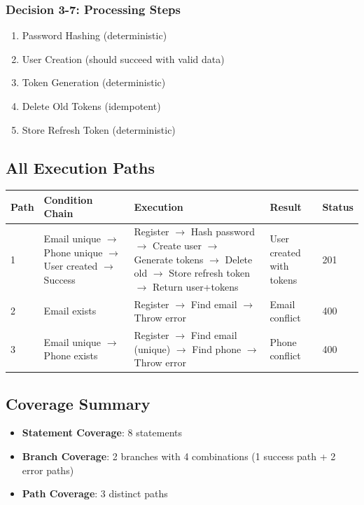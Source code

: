 \subsubsection{Decision 3-7: Processing Steps}
\begin{enumerate}
    \item Password Hashing (deterministic)
    \item User Creation (should succeed with valid data)
    \item Token Generation (deterministic)
    \item Delete Old Tokens (idempotent)
    \item Store Refresh Token (deterministic)
\end{enumerate}

\subsection{All Execution Paths}

\begin{longtable}{|L{0.8cm}|L{3.5cm}|L{6cm}|L{2.5cm}|L{1.2cm}|}
\hline
\textbf{Path} & \textbf{Condition Chain} & \textbf{Execution} & \textbf{Result} & \textbf{Status} \\
 & Email unique $\rightarrow$ Phone unique $\rightarrow$ User created $\rightarrow$ Success & Register $\rightarrow$ Hash password $\rightarrow$ Create user $\rightarrow$ Generate tokens $\rightarrow$ Delete old $\rightarrow$ Store refresh token $\rightarrow$ Return user+tokens & User created with tokens & 201 \\
 & Email exists & Register $\rightarrow$ Find email $\rightarrow$ Throw error & Email conflict & 400 \\
 & Email unique $\rightarrow$ Phone exists & Register $\rightarrow$ Find email (unique) $\rightarrow$ Find phone $\rightarrow$ Throw error & Phone conflict & 400 \\
\hline
\end{longtable}

\subsection{Coverage Summary}
\begin{itemize}
    \item \textbf{Statement Coverage}: 8 statements
    \item \textbf{Branch Coverage}: 2 branches with 4 combinations (1 success path + 2 error paths)
    \item \textbf{Path Coverage}: 3 distinct paths
\end{itemize}

